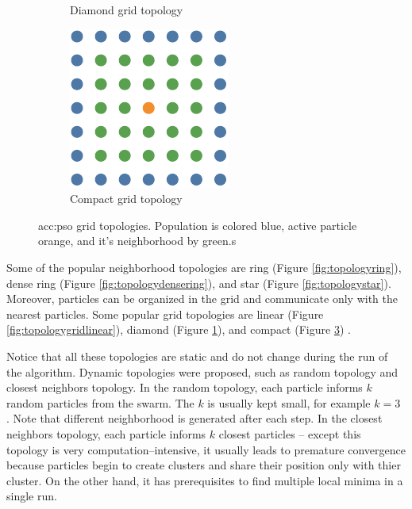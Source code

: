 \begin{figure}[t]
\begin{subfigure}[t]{0.3\textwidth}
        \caption{Diamond grid topology}
        \label{fig:topologygriddiamond}
    \end{subfigure}
    \hfill
    \begin{subfigure}[t]{0.3\textwidth}
        \includegraphics[width=\textwidth]{img/master_neigh_compact.pdf}
        \caption{Compact grid topology}
        \label{fig:topologygridcompact}
    \end{subfigure}
    \caption[\acrshort*{acc:pso} grid topologies]{\acrshort*{acc:pso} grid topologies. Population is colored blue, active particle orange, and it's neighborhood by green.s}
\end{figure}

Some of the popular neighborhood topologies are ring (Figure \ref{fig:topologyring}), dense ring (Figure \ref{fig:topologydensering}), and star (Figure \ref{fig:topologystar}). Moreover, particles can be organized in the grid and communicate only with the nearest particles. Some popular grid topologies are linear (Figure \ref{fig:topologygridlinear}), diamond (Figure \ref{fig:topologygriddiamond}), and compact (Figure \ref{fig:topologygridcompact}) \citep{PSOtopologies}.

Notice that all these topologies are static and do not change during the run of the algorithm. Dynamic topologies were proposed, such as random topology and closest neighbors topology. In the random topology, each particle informs $k$ random particles from the swarm. The $k$ is usually kept small, for example $k=3$ \citep{SPSObenchmark}. Note that different neighborhood is generated after each step. In the closest neighbors topology, each particle informs $k$ closest particles -- except this topology is very computation--intensive, it usually leads to premature convergence because particles begin to create clusters and share their position only with thier cluster. On the other hand, it has prerequisites to find multiple local minima in a single run.


